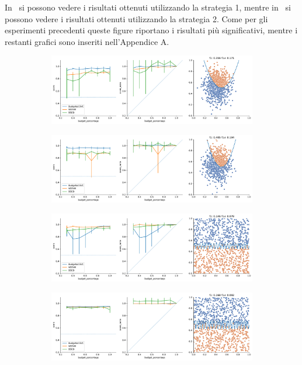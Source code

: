 In~ si possono vedere i risultati ottenuti utilizzando la strategia 1, mentre in~ si possono vedere i risultati ottenuti utilizzando la strategia 2.
Come per gli esperimenti precedenti queste figure riportano i risultati più significativi, mentre i restanti grafici sono inseriti nell'Appendice A.
\begin{figure}
    \begin{subfigure}{.5\textwidth}
        \centering
        \includegraphics[width=\textwidth]{img/comp_old/3.pdf}
    \end{subfigure}%
    \begin{subfigure}{.5\textwidth}
        \centering
        \includegraphics[width=\textwidth]{img/comp_old/4.pdf}
    \end{subfigure}
    \hfill
    \begin{subfigure}{.5\textwidth}
        \centering
        \includegraphics[width=\textwidth]{img/comp_old/8.pdf}
    \end{subfigure}
    \begin{subfigure}{.5\textwidth}
        \centering
        \includegraphics[width=\textwidth]{img/comp_old/9.pdf}

\end{subfigure}
\end{figure}
